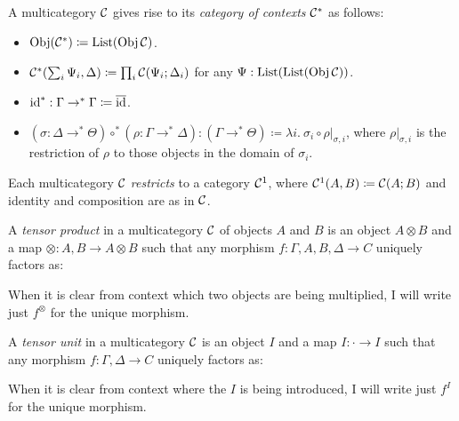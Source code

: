 \begin{definition}
  A multicategory $\mathcal C$ gives rise to its \emph{category of contexts} $\mathcal C^*$ as
  follows:
  \begin{itemize}
    \item $\operatorname{Obj}(\mathcal C^*) \coloneqq \operatorname{List}(\operatorname{Obj}\mathcal C)$.
    \item $\C^*\plr{\sum_i \Psi_i, \Delta} \coloneqq \prod_i \C(\Psi_i; \Delta_i)$
      for any $\Psi : \operatorname{List}(\operatorname{List}(\operatorname{Obj}\mathcal C))$.
    \item $\operatorname{id}^* : \Gamma \to^* \Gamma \coloneqq \overline{\operatorname{id}}$.
    \item $(\sigma : \Delta \to^* \Theta) \circ^* (\rho : \Gamma \to^* \Delta) :
      (\Gamma \to^* \Theta) \coloneqq \lambda i.~\sigma_i \circ \rho|_{\sigma,i}$,
      where $\rho|_{\sigma,i}$ is the restriction of $\rho$ to those objects
      in the domain of $\sigma_i$.
  \end{itemize}
\end{definition}

\begin{definition}
  Each multicategory $\mathcal C$ \emph{restricts} to a category $\mathcal C^1$, where
  $\mathcal C^1(A, B) \coloneqq \mathcal C(A; B)$ and identity and composition are as in $\mathcal C$.
\end{definition}

\begin{definition}\label{def:tensor-product}
  A \emph{tensor product} in a multicategory $\mathcal C$ of objects $A$ and $B$ is an
  object $A \otimes B$ and a map ${\otimes} : A, B \to A \otimes B$ such that
  any morphism $f : \Gamma, A, B, \Delta \to C$ uniquely factors as:


  When it is clear from context which two objects are being multiplied, I will
  write just $f^{\otimes}$ for the unique morphism.
\end{definition}

\begin{definition}\label{def:tensor-unit}
  A \emph{tensor unit} in a multicategory $\mathcal C$ is an object $I$ and a map
  $I : {\cdot} \to I$ such that any morphism
  $f : \Gamma, \Delta \to C$ uniquely factors as:


  When it is clear from context where the $I$ is being introduced, I will
  write just $f^I$ for the unique morphism.
\end{definition}

